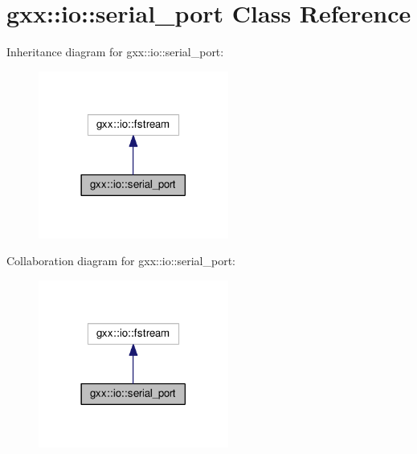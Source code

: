 \hypertarget{classgxx_1_1io_1_1serial__port}{}\section{gxx\+:\+:io\+:\+:serial\+\_\+port Class Reference}
\label{classgxx_1_1io_1_1serial__port}


Inheritance diagram for gxx\+:\+:io\+:\+:serial\+\_\+port\+:
\nopagebreak
\begin{figure}[H]
\begin{center}
\leavevmode
\includegraphics[width=177pt]{classgxx_1_1io_1_1serial__port__inherit__graph}
\end{center}
\end{figure}


Collaboration diagram for gxx\+:\+:io\+:\+:serial\+\_\+port\+:
\nopagebreak
\begin{figure}[H]
\begin{center}
\leavevmode
\includegraphics[width=177pt]{classgxx_1_1io_1_1serial__port__coll__graph}
\end{center}
\end{figure}
